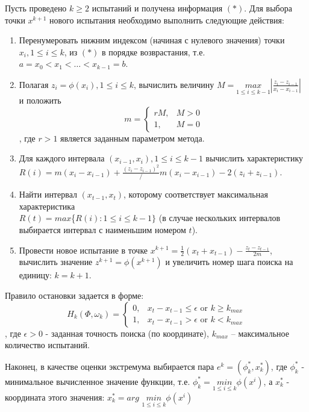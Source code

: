\documentclass{report}
\begin{document}
Пусть проведено $k\geq 2$ испытаний и получена информация $(*)$. Для выбора точки $x^{k+1}$ нового испытания необходимо выполнить следующие действия:
\begin{enumerate} 
  \item Перенумеровать нижним индексом (начиная с нулевого значения) точки $x_i, 1\leq i\leq k$, из $(*)$ в порядке возврастания, т.е. $a=x_0 < x_1 < \dots < x_{k-1}=b$.
  \item  Полагая $z_i=\phi (x_i),1\leq i\leq k$, вычислить величину $M = \underset{1\leq i \leq k-1}{max}|\frac{z_i-z_{i-1}}{x_i-x_{i-1}}|$ и положить
  \begin{equation*}
m = 
 \begin{cases}
   rM,    &\text{$M > 0$} \\
   1, &\text{$M = 0$}
 \end{cases}
\end{equation*}
, где $r > 1$ является заданным параметром метода.
  \item Для каждого интервала $(x_{i-1},x_i ),1 \leq i\leq k-1$ вычислить характеристику \\$R(i)=m(x_i-x_{i-1} )+ \frac{(z_i-z_{i-1})^2}/{m(x_i-x_{i-1})}-2(z_i+z_{i-1})$.
  \item Найти интервал $(x_{t-1},x_t )$, которому соответствует максимальная характеристика\\ $R(t)=max$\{$R(i):  1\leq i\leq k-1\}$ (в случае нескольких интервалов выбирается интервал с наименьшим номером $t$).
  \item Провести новое испытание в точке $x^{k+1}=\frac{1}{2} (x_t+x_{t-1} )- \frac{z_t-z_{t-1}}{2m}$, вычислить значение $z^{k+1}=\phi (x^{k+1})$ и увеличить номер шага поиска на единицу: $k = k + 1$.
\end{enumerate}
Правило остановки задается в форме:
\begin{equation*}
 H_k(\Phi , \omega_k) = 
 \begin{cases}
   0,    &\text{$x_t - x_{t-1} \leq \epsilon$ or $k \geq k_{max}$}\\
   1, &\text{$x_t - x_{t-1} > \epsilon$ or $k < k_{max}$}
 \end{cases}
\end{equation*}
, где $\epsilon > 0$  - заданная точность поиска (по координате), $k_{max}$ – максимальное количество испытаний.

Наконец, в качестве оценки экстремума выбирается пара $e^k=(\phi_k^*,x_k^*)$, где
$\phi_k^*$ - минимальное вычисленное значение функции, т.е. $\phi_k^*=\underset{1\leq i\leq k}{min}⁡\phi(x^i)$, 
а $x_k^*$ - координата этого значения: $x_k^*=arg$ $\underset{1\leq i\leq k}{min} \phi (x^i)$
\end{document}
